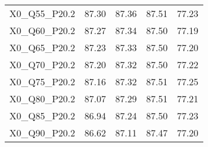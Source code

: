 \begin{table}[ht]
\begin{tabular}{rrrrr}
  X0\_Q55\_P20.2 & 87.30 & 87.36 & 87.51 & 77.23 \\ 
  X0\_Q60\_P20.2 & 87.27 & 87.34 & 87.50 & 77.19 \\ 
  X0\_Q65\_P20.2 & 87.23 & 87.33 & 87.50 & 77.20 \\ 
  X0\_Q70\_P20.2 & 87.20 & 87.32 & 87.50 & 77.22 \\ 
  X0\_Q75\_P20.2 & 87.16 & 87.32 & 87.51 & 77.25 \\ 
  X0\_Q80\_P20.2 & 87.07 & 87.29 & 87.51 & 77.21 \\ 
  X0\_Q85\_P20.2 & 86.94 & 87.24 & 87.50 & 77.23 \\ 
  X0\_Q90\_P20.2 & 86.62 & 87.11 & 87.47 & 77.20 \\ 
   \hline
\end{tabular}
\end{table}
